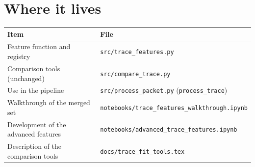 \documentclass[10pt]{article}
\newcommand{\code}[1]{\texttt{#1}}
\begin{document}
\section{Where it lives}
\begin{center}
\begin{tabular}{ll}
\toprule
Item & File \\
\midrule
Feature function and registry & \code{src/trace\_features.py} \\
Comparison tools (unchanged) & \code{src/compare\_trace.py} \\
Use in the pipeline & \code{src/process\_packet.py} (\code{process\_trace}) \\
Walkthrough of the merged set & \code{notebooks/trace\_features\_walkthrough.ipynb} \\
Development of the advanced features & \code{notebooks/advanced\_trace\_features.ipynb} \\
Description of the comparison tools & \code{docs/trace\_fit\_tools.tex} \\
\bottomrule
\end{tabular}
\end{center}
\end{document}
